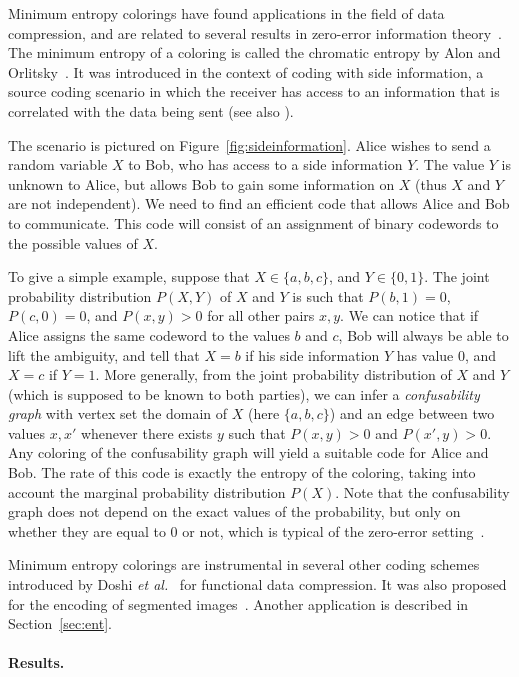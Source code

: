 \documentclass[10pt,a4paper]{article}
\begin{document}
Minimum entropy colorings have found applications in the field of data compression, and are related to several results in 
zero-error information theory~\cite{zeit}. The minimum entropy of a coloring is called the chromatic entropy by Alon and Orlitsky~\cite{AO96}. It was introduced in the context of coding with side information, a source coding scenario in which the receiver has access to an information that is correlated with the data being sent (see also \cite{KTRR03}). 

The scenario is pictured on Figure~\ref{fig:sideinformation}. Alice wishes to send a random variable $X$ to Bob, who has access to a side information $Y$. The value $Y$ is unknown to Alice, but allows Bob to gain some information on $X$ (thus $X$ and $Y$ are not independent). We need to find an efficient code that allows Alice and Bob to communicate. This code will consist of an assignment of binary codewords to the possible values of $X$.

To give a simple example, suppose that $X\in \{a,b,c\}$, and $Y\in \{0,1\}$. The joint probability distribution $P(X,Y)$ of $X$ and $Y$ is such that $P(b, 1)=0$, $P(c,0)=0$, and $P(x,y)>0$ for all other pairs $x,y$. We can notice that if Alice assigns the same codeword to the values $b$ and $c$, Bob will always be able to lift the ambiguity, and tell that $X=b$ if his side information $Y$ has value $0$, and $X=c$ if $Y=1$. More generally, from the joint probability distribution of $X$ and $Y$ (which is supposed to be known to both parties), we can infer a {\em confusability graph} with vertex set the domain of $X$ (here $\{a,b,c\}$) and an edge between two values $x,x'$ whenever there exists $y$ such that $P(x,y)>0$ and $P(x',y)>0$. Any coloring of the confusability graph will yield a suitable code for Alice and Bob. The rate of this code is exactly the entropy of the coloring, taking into account the marginal probability distribution $P(X)$. Note that the confusability graph does not depend on the exact values of the probability, but only on whether they are equal to 0 or not, which is typical of the zero-error setting~\cite{zeit}.

Minimum entropy colorings are instrumental in several other coding schemes introduced by Doshi {\em et al.}~\cite{DSMJ07,DSM07,DSMJ06} for functional data compression. It was also proposed for the encoding of segmented images~\cite{ABicip02}. Another application is described in Section~\ref{sec:ent}.

\paragraph{Results.}
\end{document}

